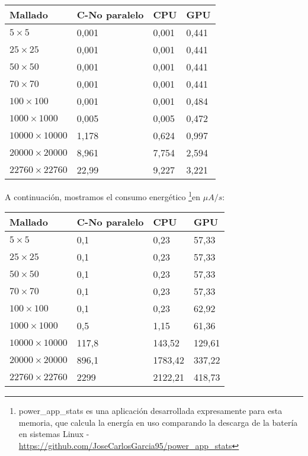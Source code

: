 \begin{ejemplo}
  \begin{table}[h]
    \centering
    \begin{tabular}{@{}llll@{}}
      \toprule
      Mallado     & C-No paralelo & CPU   & GPU   \\ \midrule
      $5\times5$         & 0,001         & 0,001 & 0,441 \\
      $25\times25$      & 0,001         & 0,001 & 0,441 \\
      $50\times50$      & 0,001         & 0,001 & 0,441 \\
      $70\times70$     & 0,001         & 0,001 & 0,441 \\
      $100\times100$     & 0,001         & 0,001 & 0,484 \\
      $1000\times1000$   & 0,005         & 0,005 & 0,472 \\
      $10000\times10000$ & 1,178         & 0,624 & 0,997 \\
      $20000\times20000$ & 8,961         & 7,754 & 2,594 \\
      $22760\times22760$ & 22,99         & 9,227 & 3,221 \\ \bottomrule
    \end{tabular}
  \end{table}

  \newpage
  A continuación, mostramos el consumo energético \footnote{power\_app\_stats es una aplicación desarrollada expresamente para esta memoria, que calcula la energía en uso comparando la descarga de la batería en sistemas Linux - \href{https://github.com/JoseCarlosGarcia95/power_app_stats}{https://github.com/JoseCarlosGarcia95/power\_app\_stats}}en $\mu A / s$:
  
  \begin{table}[h]
    \centering
    \begin{tabular}{@{}llll@{}}
      \toprule
Mallado     & C-No paralelo & CPU     & GPU    \\ \midrule
$5\times5$         & 0,1           & 0,23    & 57,33  \\
$25\times25$       & 0,1           & 0,23    & 57,33  \\
$50\times50$       & 0,1           & 0,23    & 57,33  \\
$70\times70$       & 0,1           & 0,23    & 57,33  \\
$100\times100$     & 0,1           & 0,23    & 62,92  \\
$1000\times1000$   & 0,5           & 1,15    & 61,36  \\
$10000\times10000$ & 117,8         & 143,52  & 129,61 \\
$20000\times20000$ & 896,1         & 1783,42 & 337,22 \\
$22760\times22760$ & 2299          & 2122,21 & 418,73 \\ \bottomrule
    \end{tabular}
    

\end{table}
\end{ejemplo}
